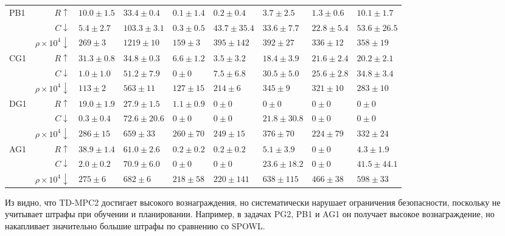 \begin{table}[ht]
{\begin{tabular}{lr|llll|lll}
    \multirow{3}{*}{PB1}
        & $R\uparrow$ & $10.0 \pm 1.5$ & $33.4 \pm 0.4$ & $0.1 \pm 1.4$ & $0.2 \pm 0.4$ & $3.7 \pm 2.5$ & $1.3 \pm 0.6$ & $10.1 \pm 1.7$ \\
        & $C\downarrow$ & $5.4 \pm 2.7$ & $103.3 \pm 3.1$ & $0.3 \pm 0.5$ & $43.7 \pm 35.4$ & $33.6 \pm 7.7$ & $22.8 \pm 5.4$ & $53.6 \pm 26.5$ \\
        & $\rho \times 10^4\downarrow$ & $269 \pm 3$ & $1219 \pm 10$ & $159 \pm 3$ & $395 \pm 142$ & $392 \pm 27$ & $336 \pm 12$ & $358 \pm 19$ \\
    \midrule
    \multirow{3}{*}{CG1}
        & $R\uparrow$ & $31.3 \pm 0.8$ & $34.8 \pm 0.3$ & $6.6 \pm 1.2$ & $3.5 \pm 3.2$ & $18.4 \pm 3.9$ & $21.6 \pm 2.4$ & $20.2 \pm 2.1$ \\
        & $C\downarrow$ & $1.0 \pm 1.0$ & $51.2 \pm 7.9$ & $0 \pm 0$ & $7.5 \pm 6.8$ & $30.5 \pm 5.0$ & $25.6 \pm 2.8$ & $34.8 \pm 3.4$ \\
        & $\rho \times 10^4\downarrow$ & $113 \pm 2$ & $563 \pm 11$ & $127 \pm 15$ & $214 \pm 6$ & $345 \pm 9$ & $321 \pm 10$ & $283 \pm 10$ \\
    \midrule
    \multirow{3}{*}{DG1}
        & $R\uparrow$ & $19.0 \pm 1.9$ & $27.9 \pm 1.5$ & $1.1 \pm 0.9$ & $0 \pm 0$ & $0 \pm 0$ & $0 \pm 0$ & $0 \pm 0$ \\
        & $C\downarrow$ & $0.3 \pm 0.4$ & $72.6 \pm 20.6$ & $0 \pm 0$ & $0 \pm 0$ & $21.8 \pm 30.8$ & $0 \pm 0$ & $0 \pm 0$ \\
        & $\rho \times 10^4\downarrow$ & $286 \pm 15$ & $659 \pm 33$ & $260 \pm 70$ & $249 \pm 15$ & $376 \pm 70$ & $224 \pm 79$ & $332 \pm 24$ \\
    \midrule
    \multirow{3}{*}{AG1}
        & $R\uparrow$ & $38.9 \pm 1.4$ & $61.0 \pm 2.6$ & $0.2 \pm 0.2$ & $0.2 \pm 0.2$ & $5.1 \pm 3.9$ & $0 \pm 0$ & $4.3 \pm 1.9$ \\
        & $C\downarrow$ & $2.0 \pm 0.2$ & $70.9 \pm 6.0$ & $0 \pm 0$ & $0 \pm 0$ & $23.6 \pm 18.2$ & $0 \pm 0$ & $41.5 \pm 44.1$ \\
        & $\rho \times 10^4\downarrow$ & $275 \pm 6$ & $682 \pm 6$ & $218 \pm 58$ & $220 \pm 141$ & $638 \pm 115$ & $466 \pm 38$ & $598 \pm 33$ \\
    \bottomrule
    \end{tabular}
    }
\end{table}

Из  видно, что TD-MPC2 достигает высокого вознаграждения, но систематически нарушает ограничения безопасности, поскольку не учитывает штрафы при обучении и планировании. Например, в задачах PG2, PB1 и AG1 он получает высокое вознаграждение, но накапливает значительно большие штрафы по сравнению со SPOWL.

